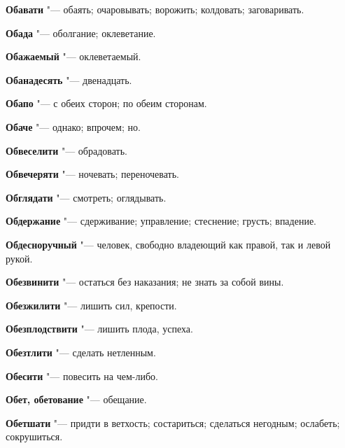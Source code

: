 \begin{mymulticols}{2}
\noindent\textbf{Обавати} "--- обаять; очаровывать; ворожить; колдовать; заговаривать. 




\noindent\textbf{Обада} "--- оболгание; оклеветание. 




\noindent\textbf{Обажаемый} "--- оклеветаемый. 




\noindent\textbf{Обанадесять} "--- двенадцать. 




\noindent\textbf{Обапо} "--- с обеих сторон; по обеим сторонам. 




\noindent\textbf{Обаче} "--- однако; впрочем; но. 




\noindent\textbf{Обвеселити} "--- обрадовать. 




\noindent\textbf{Обвечеряти} "--- ночевать; переночевать. 




\noindent\textbf{Обглядати} "--- смотреть; оглядывать. 




\noindent\textbf{Обдержание} "--- сдерживание; управление; стеснение; грусть; впадение. 




\noindent\textbf{Обдесноручный} "--- человек, свободно владеющий как правой, так и левой рукой. 




\noindent\textbf{Обезвинити} "--- остаться без наказания; не знать за собой вины. 




\noindent\textbf{Обезжилити} "--- лишить сил, крепости. 




\noindent\textbf{Обезплодствити} "--- лишить плода, успеха. 




\noindent\textbf{Обезтлити} "--- сделать нетленным. 




\noindent\textbf{Обесити} "--- повесить на чем-либо. 




\noindent\textbf{Обет, обетование} "--- обещание. 




\noindent\textbf{Обетшати} "--- придти в ветхость; состариться; сделаться негодным; ослабеть; сокрушиться. 





\end{mymulticols}
